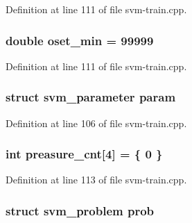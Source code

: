 Definition at line 111 of file svm-\/train.\-cpp.

\hypertarget{svm-train_8cpp_a2bcd8955244b3b5ed1918acc0ce4014e}{
\subsubsection[{oset\-\_\-min}]{\setlength{\rightskip}{0pt plus 5cm}double oset\-\_\-min = 99999}}\label{svm-train_8cpp_a2bcd8955244b3b5ed1918acc0ce4014e}


Definition at line 111 of file svm-\/train.\-cpp.

\hypertarget{svm-train_8cpp_abef2e39cc4fa6cc6870dddf9afa2cfad}{
\subsubsection[{param}]{\setlength{\rightskip}{0pt plus 5cm}struct {\bf svm\-\_\-parameter} param}}\label{svm-train_8cpp_abef2e39cc4fa6cc6870dddf9afa2cfad}


Definition at line 106 of file svm-\/train.\-cpp.

\hypertarget{svm-train_8cpp_aee8f27d5a82f967da296688aee11c230}{
\subsubsection[{preasure\-\_\-cnt}]{\setlength{\rightskip}{0pt plus 5cm}int preasure\-\_\-cnt\mbox{[}4\mbox{]} = \{ 0 \}}}\label{svm-train_8cpp_aee8f27d5a82f967da296688aee11c230}


Definition at line 113 of file svm-\/train.\-cpp.

\hypertarget{svm-train_8cpp_a3d3cd08abb1a582bcbb3095eb03ed0d6}{
\subsubsection[{prob}]{\setlength{\rightskip}{0pt plus 5cm}struct {\bf svm\-\_\-problem} prob}}\label{svm-train_8cpp_a3d3cd08abb1a582bcbb3095eb03ed0d6}


